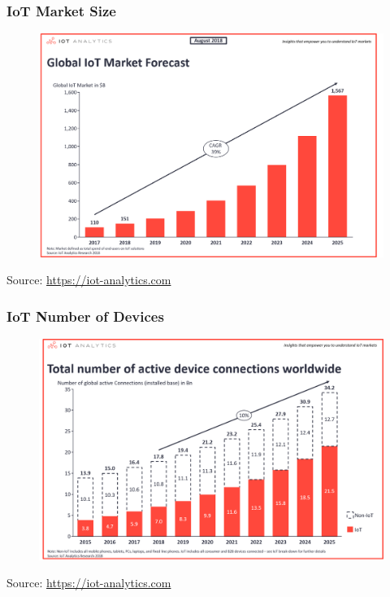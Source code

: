 \begin{frame}
  \frametitle{IoT Market Size}
    \begin{figure}
      \centering
      \includegraphics[scale=0.15]{images/iot1.png}
    \end{figure}
    Source: \href{https://iot-analytics.com}{https://iot-analytics.com}
\end{frame}

\begin{frame}
  \frametitle{IoT Number of Devices}
    \begin{figure}
      \centering
      \includegraphics[scale=0.16]{images/iot2.png}
    \end{figure}
    Source: \href{https://iot-analytics.com}{https://iot-analytics.com}
\end{frame}

